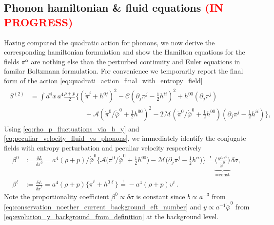 \subsection{Phonon hamiltonian \& fluid equations \textcolor{red}{(IN PROGRESS)}}
%
Having computed the quadratic action for phonons, we now derive the corresponding hamiltonian formulation and show the Hamilton equations for the fields $\pi^\alpha$ are nothing else than the perturbed continuity and Euler equations in familar Boltzmann formulation.
For convenience we temporarily report the final form of the action \eqref{eq:quadrati_action_final_with_entropy_field}
{\small\begin{align}
\begin{aligned}
     S^{(2)}&=\int\! d^4x\, a^4\frac{\rho+p}{2}\bigg\{
    (\dot{\pi}^j+h^{0j})^2 -\mathcal{C}(\partial_j \pi^j-\tfrac12 h^{ii})^2 + h^{00} (\partial_j\pi^j) \\[2.5pt]
    &\qquad\qquad\qquad \qquad + \mathcal{A} (\dot{\pi}^0/\dot{\bar{\varphi}}^0+\tfrac12 h^{00})^2 - 2\mathcal{M}(\dot{\pi}^0/\dot{\bar{\varphi}}^0+\tfrac12 h^{00}) (\partial_j \pi^j-\tfrac12 h^{ii}) \bigg\},
\end{aligned}
\end{align}}
Using \eqref{eq:rho_p_fluctuations_via_b_y} and \eqref{eq:peculiar_velocity_fluid_vs_phonons}, we immediately identify the conjugate fields with entropy perturbation and peculiar velocity respectively 
{\small\begin{subequations}\label{eq:conjugate_field_pi_with_entropy}
\begin{align}
    \beta^0&:=\frac{\delta L}{\delta \dot{\pi}^0}=a^4(\rho+p)/\dot{\bar{\varphi}}^0\bigg\{\mathcal{A}\big(\dot{\pi}^0/\dot{\bar{\varphi}}^0+\tfrac12 h^{00}\big) - \mathcal{M}\big(\partial_j \pi^j-\tfrac12 h^{ii}\big)\bigg\} 
    \overset{!}{=} \underbrace{\Big(\frac{yb a^4}{\dot{\bar{\varphi}}^0}\Big)}_{=\text{const}}\, \delta\sigma, \label{eq:conjugate_field_pi_with_entropy_beta_0}
    \\[2.5pt]
    \beta^\ell&:=\frac{\delta L}{\delta \dot{\pi}^\ell}=a^4(\rho+p)\bigg\{\dot{\pi}^\ell+h^{0\ell}\bigg\} \overset{!}{=}-a^4(\rho+p)v^\ell\,. \label{eq:conjugate_field_pi_with_entropy_beta_j}
\end{align}
\end{subequations}}
Note the proportionality coefficient $\beta^0\propto  \delta\sigma$ is constant since $b\propto a^{-3}$ from \eqref{eq:conservation_noether_current_background_eft_number} and $y\propto a^{-1}\dot{\bar{\varphi}}^0$ from \eqref{eq:evolution_y_background_from_definition} at the background level.

